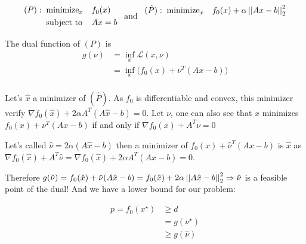 \documentclass{article}
\begin{document}
\begin{equation*}
    \begin{aligned}
        (P):\;\; & \text{minimize}_x &  & f_0(x) \\
                 & \text{subject to} &  & Ax=b   \\
    \end{aligned}
    \;\;\;\text{and}\;\;\;
    \begin{aligned}
        (\hat{P}):\;\; & \text{minimize}_x &  & f_0(x) + \alpha \left|\left| Ax -b \right|\right|_2^2 \\
                       &                   &  &                                  \\
    \end{aligned}
\end{equation*}

The dual function of $(P)$ is
\begin{equation*}
    \begin{aligned}
        g(\nu) & = \inf_x \mathcal{L}(x, \nu)             \\
               & = \inf_x \big(f_0(x) + \nu^T(Ax -b)\big) \\
    \end{aligned}
\end{equation*}


Let's $\hat{x}$ a minimizer of $(\hat{P})$. As $f_0$ is differentiable and convex, this minimizer verify $\nabla f_0(\hat{x}) + 2\alpha A^T(A\hat{x} -b) = 0$.
Let $\nu$, one can also see that $x$ minimizes $f_0(x) + \nu^T(Ax -b)$ if and only if $\nabla f_0(x) + A^T\nu = 0$

Let's called $\hat{\nu} = 2\alpha(A\hat{x} -b)$ then a minimizer of $f_0(x) + \hat{\nu}^T(Ax -b)$ is $\hat{x}$ as
$\nabla f_0(\hat{x}) + A^T\hat{\nu} = \nabla f_0(\hat{x}) + 2\alpha A^T(A\hat{x} -b) = 0$.

Therefore $g(\hat{\nu}) = f_0(\hat{x}) + \hat{\nu}(A\hat{x} - b) = f_0(\hat{x}) + 2\alpha \left|\left| A\hat{x} - b \right|\right|_2^2
    \Rightarrow \hat{\nu}$ is a feasible point of the dual! And we have a lower bound for our problem:

\begin{equation*}
    \begin{aligned}
        p = f_0(x^\star) & \ge d            \\
                         & = g(\nu^\star)   \\
                         & \ge g(\hat{\nu}) \\
    \end{aligned}
\end{equation*}
\end{document}
